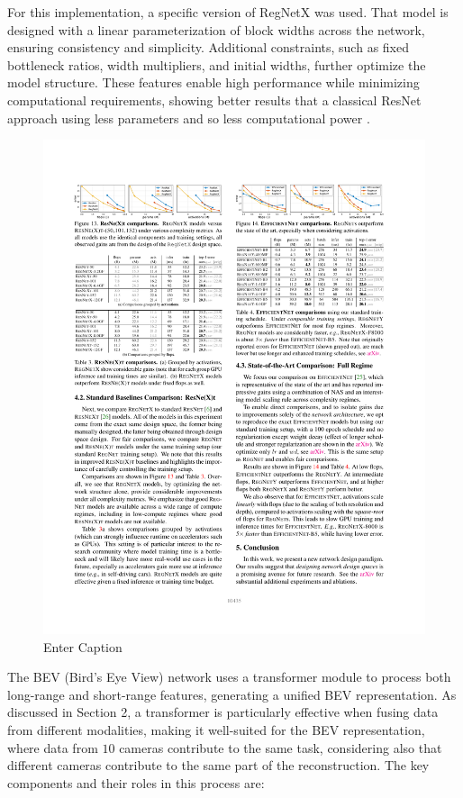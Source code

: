 For this implementation, a specific version of RegNetX was used. That model is designed with a linear parameterization of block widths across the network, ensuring consistency and simplicity. Additional constraints, such as fixed bottleneck ratios, width multipliers, and initial widths, further optimize the model structure. These features enable high performance while minimizing computational requirements, showing better results that a classical ResNet approach using less parameters and so less computational power \cite{Radosavovic2020}.
\begin{figure}[H]
    \centering
    \includegraphics[width=1\linewidth]{Radosavovic_Designing_Network_Design_Spaces_CVPR_2020_paper (2).pdf}
    \caption{Enter Caption}
    \label{fig:enter-label}
\end{figure}

The BEV (Bird’s Eye View) network uses a transformer module to process both long-range and short-range features, generating a unified BEV representation. As discussed in Section 2, a transformer is particularly effective when fusing data from different modalities, making it well-suited for the BEV representation, where data from $10$ cameras contribute to the same task, considering also that different cameras contribute to the same part of the reconstruction. 
The key components and their roles in this process are:


